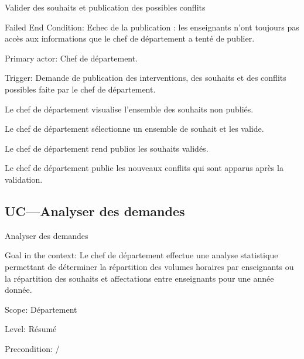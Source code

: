 \begin{ocl}
\begin{usecase}{Valider des souhaits et publication des possibles conflits}
\begin{information}
 \item[{Failed End Condition:}]
 Echec de la publication : les enseignants n'ont toujours pas accès aux informations que le chef de département a tenté de publier.

\item[Primary actor:] Chef de département.

 \item[{Trigger:}]
 Demande de publication des interventions, des souhaits et des conflits possibles faite par le chef de département.
\end{information}

\begin{scenario}
\item Le chef de département visualise l'ensemble des souhaits non publiés.
 \item Le chef de département sélectionne un ensemble de souhait et les valide.
 \item Le chef de département rend publics les souhaits validés.
 \item Le chef de département publie les nouveaux conflits qui sont apparus après la validation.
\end{scenario}

\end{usecase}

 \subsection{UC---Analyser des demandes}

\begin{usecase}{Analyser des demandes}\label{usecase:analyse}

\begin{information}
	

\item[Goal in the context:] Le chef de département effectue une analyse statistique permettant de déterminer la répartition des volumes horaires par enseignants ou la répartition des souhaits et affectations entre enseignants pour une année donnée. 

\item[Scope:] Département

\item[{Level:}] Résumé

\item[{Precondition:}]
 /


\end{information}
\end{usecase}
\end{ocl}
